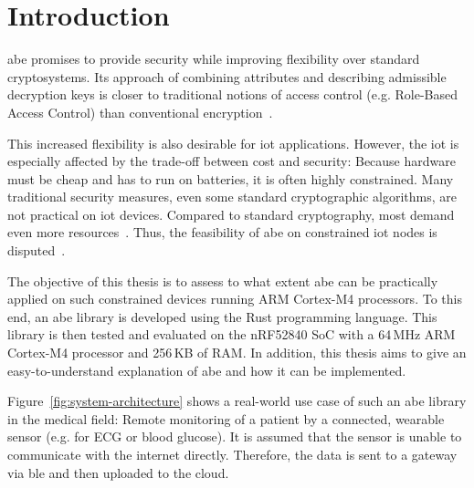 
\chapter{Introduction}\label{chapter:introduction}

\acrfull{abe} promises to provide security while improving flexibility over standard cryptosystems.
Its approach of combining \glspl{attribute} and  describing admissible decryption keys is closer to traditional notions of access control (e.g. Role-Based Access Control) than conventional encryption~\cite{bethencourt_ciphertext-policy_2007}.

This increased flexibility is also desirable for \acrfull{iot} applications.
However, the \acrshort{iot} is especially affected by the trade-off between cost and security:
Because hardware must be cheap and has to run on batteries, it is often highly constrained.
Many traditional security measures, even some standard cryptographic algorithms, are not practical on \acrshort{iot} devices.
Compared to standard cryptography, most  demand even more resources~\cite{wang_performance_2014}.
Thus, the feasibility of \acrshort{abe} on constrained \acrshort{iot} nodes is disputed~\cite{ambrosin_feasibility_2016,ambrosin_feasibility_2015,borgh_attribute-based_2016,girgenti_feasibility_2019,wang_performance_2014}.

The objective of this thesis is to assess to what extent \acrshort{abe} can be practically applied on such constrained devices running ARM Cortex-M4 processors.
To this end, an \acrshort{abe} library is developed using the Rust programming language.
This library is then tested and evaluated on the nRF52840 SoC with a 64\,MHz ARM Cortex-M4 processor and 256\,KB of RAM.
In addition, this thesis aims to give an easy-to-understand explanation of \acrshort{abe} and how it can be implemented.



Figure~\ref{fig:system-architecture} shows a real-world use case of such an \acrshort{abe} library in the medical field:
Remote monitoring of a patient by a connected, wearable sensor (e.g. for ECG or blood glucose).
It is assumed that the sensor is unable to communicate with the internet directly.
Therefore, the data is sent to a gateway via \acrfull{ble} and then uploaded to the cloud.

